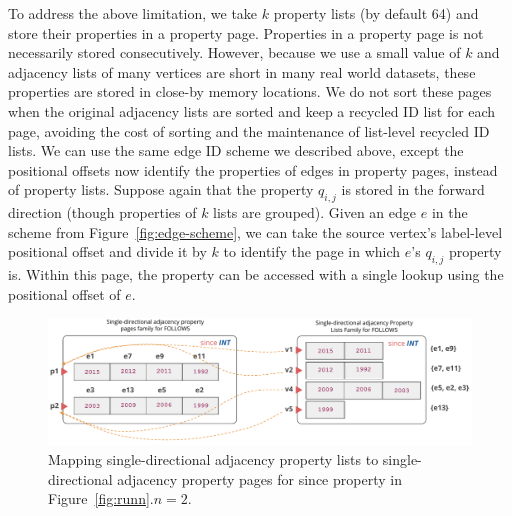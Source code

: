  To address the above limitation, we take $k$ property lists (by default 64) and store their properties in a property page. Properties in a property page is not necessarily stored consecutively. However, because we use a small value of $k$ and adjacency lists of many vertices are short in many real world datasets, these properties are stored in close-by memory locations. We do not sort these pages when the original adjacency lists are sorted and keep a recycled ID list for each page, avoiding the cost of sorting and the maintenance of list-level recycled ID lists. We can use the same edge ID scheme we described above, except the positional offsets now identify the properties of edges in property pages, instead of property lists. Suppose again that the property $q_{i, j}$ is stored in the forward direction (though properties of $k$ lists are grouped). Given an edge $e$ in the scheme from Figure~\ref{fig:edge-scheme}, we can take the source vertex's label-level positional offset and divide it by $k$ to identify the page in which $e$'s $q_{i, j}$ property is. Within this page, the property can be accessed with a single lookup using the positional offset of $e$.

\begin{figure}
	\hfill\includegraphics[scale=0.78]{img/paged}\hspace*{\fill}
	\captionsetup{justification=centering}
	\caption{Mapping single-directional adjacency property lists to single-directional adjacency property pages for since property in Figure~\ref{fig:runn}.$n=2$.}
	\label{fig:paged}
\end{figure}



